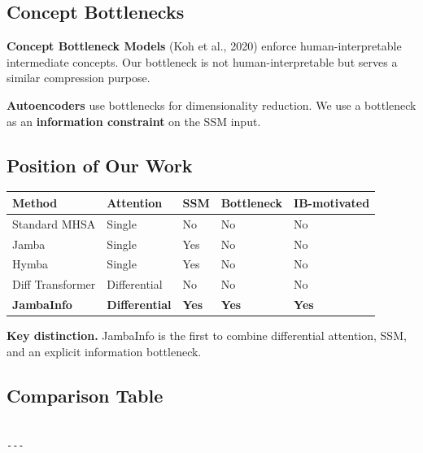 \subsection{Concept Bottlenecks}

\textbf{Concept Bottleneck Models} (Koh et al., 2020) enforce human-interpretable 
intermediate concepts. Our bottleneck is not human-interpretable but 
serves a similar compression purpose.

\textbf{Autoencoders} use bottlenecks for dimensionality reduction. We use a 
bottleneck as an \textbf{information constraint} on the SSM input.

\subsection{Position of Our Work}

\begin{table}[H]
\centering
\small
\begin{tabular}{lllll}
\toprule
\textbf{Method} & \textbf{Attention} & \textbf{SSM} & \textbf{Bottleneck} & \textbf{IB-motivated} \\
\midrule
Standard MHSA & Single & No & No & No \\
Jamba & Single & Yes & No & No \\
Hymba & Single & Yes & No & No \\
Diff Transformer & Differential & No & No & No \\
\textbf{JambaInfo} & \textbf{Differential} & \textbf{Yes} & \textbf{Yes} & \textbf{Yes} \\
\bottomrule
\end{tabular}
\end{table}

\textbf{Key distinction.} JambaInfo is the first to combine differential 
attention, SSM, and an explicit information bottleneck.



\subsection{Comparison Table}

\begin{lstlisting}

---
\end{lstlisting}